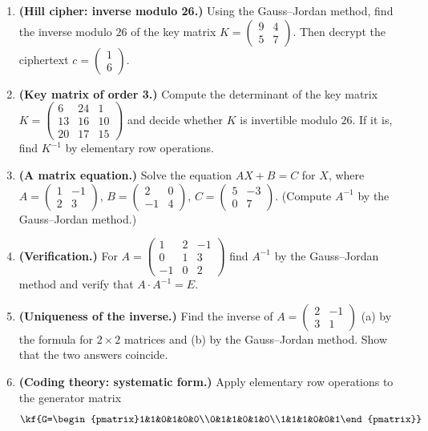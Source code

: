 \begin{enumerate}[label=\arabic*.,]
\item \textbf{(Hill cipher: inverse modulo 26.)} Using the Gauss–Jordan method,
find the inverse modulo $26$ of the key matrix $K=\begin{pmatrix}9&4\\5&7\end{pmatrix}$.
Then decrypt the ciphertext $c=\begin{pmatrix}1\\6\end{pmatrix}$.
\item \textbf{(Key matrix of order 3.)} Compute the determinant of the key matrix
$K=\begin{pmatrix}6&24&1\\13&16&10\\20&17&15\end{pmatrix}$ and decide whether $K$
is invertible modulo $26$. If it is, find $K^{-1}$ by elementary row operations.
\item \textbf{(A matrix equation.)} Solve the equation $AX+B=C$ for $X$, where
$A=\begin{pmatrix}1&-1\\2&3\end{pmatrix}$,
$B=\begin{pmatrix}2&0\\-1&4\end{pmatrix}$,
$C=\begin{pmatrix}5&-3\\0&7\end{pmatrix}$.
(Compute $A^{-1}$ by the Gauss–Jordan method.)
\item \textbf{(Verification.)} For $A=\begin{pmatrix}1&2&-1\\0&1&3\\-1&0&2\end{pmatrix}$
find $A^{-1}$ by the Gauss–Jordan method and verify that $A\cdot A^{-1}=E$.
\item \textbf{(Uniqueness of the inverse.)} Find the inverse of
$A=\begin{pmatrix}2&-1\\3&1\end{pmatrix}$ (a) by the formula for $2\times 2$
matrices and (b) by the Gauss–Jordan method. Show that the two answers coincide.
\item \textbf{(Coding theory: systematic form.)} Apply elementary row operations
to the generator matrix
\[\kf{G=\begin{pmatrix}1&1&0&1&0&0\\0&1&1&0&1&0\\1&1&1&0&0&1\end{pmatrix}}\]

\end{enumerate}

